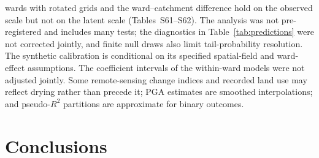 \documentclass[preprint,12pt,authoryear]{elsarticle}
\begin{document}
wards with rotated grids and the ward--catchment difference hold on the observed scale but not on the latent scale (Tables~S61--S62). The analysis was not pre-registered and includes many tests; the diagnostics in Table~\ref{tab:predictions} were not corrected jointly, and finite null draws also limit tail-probability resolution. The synthetic calibration is conditional on its specified spatial-field and ward-effect assumptions. The coefficient intervals of the within-ward models were not adjusted jointly. Some remote-sensing change indices and recorded land use may reflect drying rather than precede it; PGA estimates are smoothed interpolations; and pseudo-$R^2$ partitions are approximate for binary outcomes.

\section{Conclusions}\label{sec:conclusions}
\end{document}
